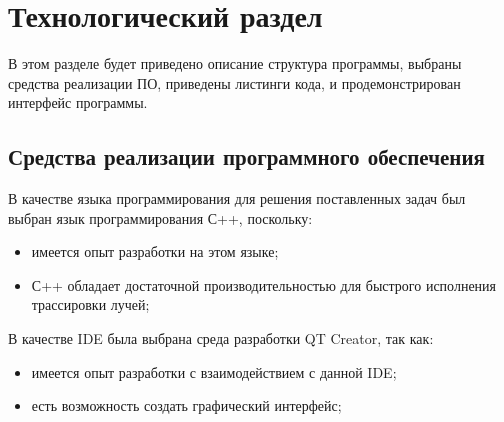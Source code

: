 \chapter{Технологический раздел}
В этом разделе будет приведено описание структура программы, выбраны средства реализации ПО,
приведены листинги кода, и продемонстрирован интерфейс программы.

\section{Средства реализации программного обеспечения}
В качестве языка программирования для решения поставленных задач был выбран язык программирования С++, поскольку:
\begin{itemize}
	\item имеется опыт разработки на этом языке;
	\item С++ обладает достаточной производительностью для быстрого исполнения трассировки лучей;
\end{itemize}

В качестве IDE была выбрана среда разработки QT Creator, так как:
\begin{itemize}
	\item имеется опыт разработки с взаимодействием с данной IDE;
	\item есть возможность создать графический интерфейс;
\end{itemize}


